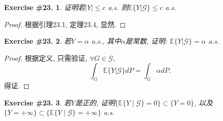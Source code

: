 \documentclass[UTF8, a4paper]{article}
\newtheorem{exercise}{Exercise \#23.}
\begin{document}
\begin{framed}
\begin{exercise}
证明若\(|Y| \leq c\) a.s. 则\(\mathbb{E}\{Y|\mathcal{G}\} \leq c\) a.s.
\end{exercise}
\end{framed}


\begin{proof}
根据引理23.1, 定理23.4, 显然.
\end{proof}


\begin{framed}
\begin{exercise}
若\(Y = \alpha\) a.s., 其中\(\alpha\)是常数, 证明: \(\mathbb{E}\{Y|\mathcal{G}\} = \alpha\) a.s.
\end{exercise}
\end{framed}

\begin{proof}
根据定义, 只需验证, \(\forall G \in \mathcal{G}\), 
$$
\int_G \mathbb{E}\{Y|\mathcal{G}\} dP = \int_G \alpha dP.
$$
得证.
\end{proof}


\begin{framed}
\begin{exercise}
若\(Y\)是正的, 证明\(\{\mathbb{E}\{Y \mid \mathcal{G}\} = 0\} \subset \{Y = 0\}\), 以及\(\{Y = +\infty\} \subset \{\mathbb{E}\{Y\mid \mathcal{G}\} = + \infty\}\) a.s.
\end{exercise}
\end{framed}
\end{document}
